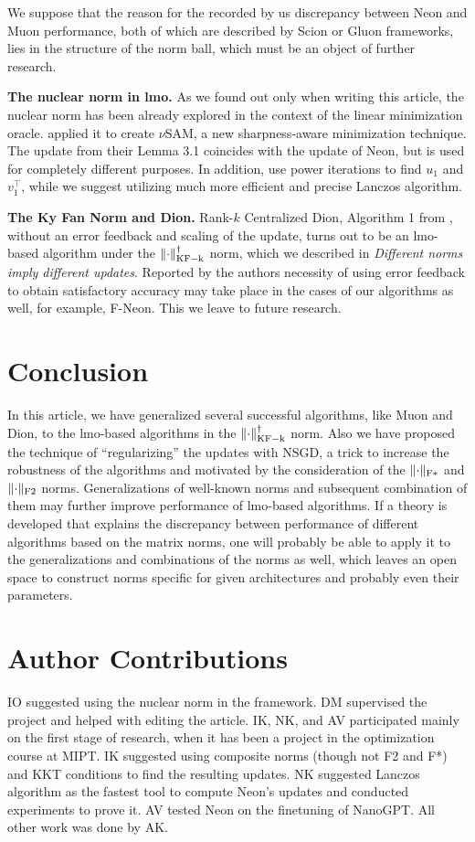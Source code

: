 \documentclass{article} %
\DeclarePairedDelimiter{\normkfk}{\|}{\|_\mathrm{KF-k}}
\DeclarePairedDelimiter{\normfstar}{\|}{\|_\mathrm{F*}}
\DeclarePairedDelimiter{\normftwo}{\|}{\|_\mathrm{F2}}
\begin{document}
We suppose that the reason for the recorded by us discrepancy between Neon and Muon performance, both of which are described by Scion or Gluon frameworks, lies in the structure of the norm ball, which must be an object of further research.

{\bf The nuclear norm in lmo.} As we found out only when writing this article, the nuclear norm has been already explored in the context of the linear minimization oracle. \citet{pethick2025sam} applied it to create $\nu$SAM, a new sharpness-aware minimization technique. The update from their Lemma 3.1 coincides with the update of Neon, but is used for completely different purposes. In addition, \citet{pethick2025sam} use power iterations to find $u_1$ and $v_1^\top$, while we suggest utilizing much more efficient and precise Lanczos algorithm.

{\bf The Ky Fan Norm and Dion.} Rank-$k$ Centralized Dion, Algorithm 1 from \citet{ahn2025dioncommunicationefficientoptimizerlarge}, without an error feedback and scaling of the update, turns out to be an lmo-based algorithm under the $\normkfk{\cdot}^\dagger$ norm, which we described in {\it Different norms imply different updates}. Reported by the authors necessity of using error feedback to obtain satisfactory accuracy may take place in the cases of our algorithms as well, for example, F-Neon. This we leave to future research.

\section{Conclusion}
In this article, we have generalized several successful algorithms, like Muon and Dion, to the lmo-based algorithms in the $\normkfk{\cdot}^\dagger$ norm. Also we have proposed the technique of ``regularizing'' the updates with NSGD, a trick to increase the robustness of the algorithms and motivated by the consideration of the $\normfstar{\cdot}$ and $\normftwo{\cdot}$ norms. Generalizations of well-known norms and subsequent combination of them may further improve performance of lmo-based algorithms. If a theory is developed that explains the discrepancy between performance of different algorithms based on the matrix norms, one will probably be able to apply it to the generalizations and combinations of the norms as well, which leaves an open space to construct norms specific for given architectures and probably even their parameters.

\section{Author Contributions}
IO suggested using the nuclear norm in the \citet{bernstein2024oldoptimizernewnorm} framework. DM supervised the project and helped with editing the article. IK, NK, and AV participated mainly on the first stage of research, when it has been a project in the optimization course at MIPT. IK suggested using composite norms (though not F2 and F*) and KKT conditions to find the resulting updates. NK suggested Lanczos algorithm as the fastest tool to compute Neon's updates and conducted experiments to prove it. AV tested Neon on the finetuning of NanoGPT. All other work was done by AK.
\end{document}
